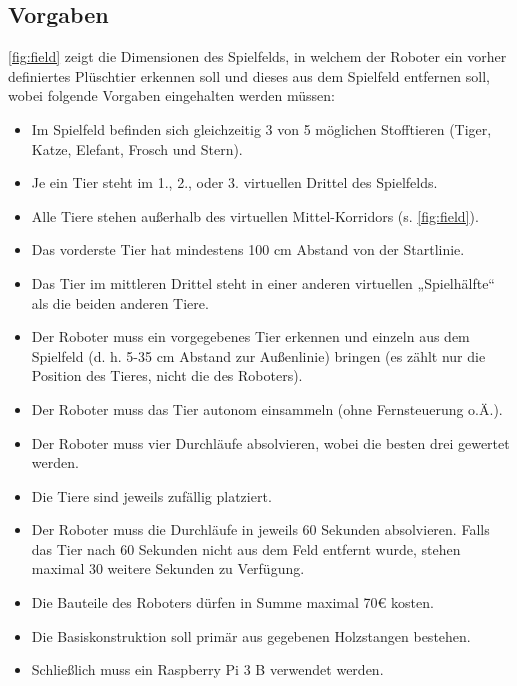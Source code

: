 \subsection{Vorgaben}


\autoref{fig:field} zeigt die Dimensionen des Spielfelds, in welchem der Roboter ein vorher definiertes Plüschtier erkennen soll und dieses aus dem Spielfeld entfernen soll, wobei folgende Vorgaben eingehalten werden müssen:

\begin{itemize}
    \item Im Spielfeld befinden sich gleichzeitig 3 von 5 möglichen Stofftieren (Tiger, Katze, Elefant, Frosch und Stern).
    \item Je ein Tier steht im 1., 2., oder 3. virtuellen Drittel des Spielfelds.
    \item Alle Tiere stehen außerhalb des virtuellen Mittel-Korridors (s. \autoref{fig:field}).
    \item Das vorderste Tier hat mindestens 100 cm Abstand von der Startlinie.
    \item Das Tier im mittleren Drittel steht in einer anderen virtuellen „Spielhälfte“ als die beiden anderen Tiere.
    \item Der Roboter muss ein vorgegebenes Tier erkennen und einzeln aus dem Spielfeld (d. h. 5-35 cm Abstand zur Außenlinie) bringen (es zählt nur die Position des Tieres, nicht die des Roboters).
    \item Der Roboter muss das Tier autonom einsammeln (ohne Fernsteuerung o.Ä.).
    \item Der Roboter muss vier Durchläufe absolvieren, wobei die besten drei gewertet werden.
    \item Die Tiere sind jeweils zufällig platziert.
    \item Der Roboter muss die Durchläufe in jeweils 60 Sekunden absolvieren. Falls das Tier nach 60 Sekunden nicht aus dem Feld entfernt wurde, stehen maximal 30 weitere Sekunden zu Verfügung.
    \item Die Bauteile des Roboters dürfen in Summe maximal 70€ kosten.
    \item Die Basiskonstruktion soll primär aus gegebenen Holzstangen bestehen.
    \item Schließlich muss ein Raspberry Pi 3 B verwendet werden.
\end{itemize}

